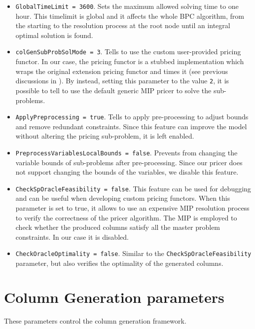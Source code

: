 \begin{itemize}
	\item \texttt{GlobalTimeLimit = 3600}.
	      Sets the maximum allowed solving time to one hour.
	      This timelimit is global and it affects the whole BPC algorithm, from the starting
	      to the resolution process at the root node until an integral optimal solution is found.
	\item \texttt{colGenSubProbSolMode = 3}.
	      Tells \bapcod{} to use the custom user-provided pricing functor.
	      In our case, the pricing functor is a stubbed implementation which wraps the original \vrpsolver{} extension pricing functor
	      and times it (see previous discussions in ).
	      By instead, setting this parameter to the value \texttt{2},
	      it is possible to tell \bapcod{} to use the default generic MIP pricer to solve the sub-problems.
	\item \texttt{ApplyPreprocessing = true}.
	      Tells \bapcod{} to apply pre-processing to adjust bounds and remove redundant constraints.
	      Since this feature can improve the model without altering the pricing sub-problem,
	      it is left enabled.
	\item \texttt{PreprocessVariablesLocalBounds = false}.
	      Prevents \bapcod{} from changing the variable bounds of sub-problems after pre-processing.
	      Since our pricer does not support changing the bounds of the variables,
	      we disable this feature.
	\item \texttt{CheckSpOracleFeasibility = false}.
	      This feature can be used for debugging and can be useful when developing custom pricing functors.
	      When this parameter is set to true, it allows to use an expensive MIP resolution process
	      to verify the correctness of the pricer algorithm.
	      The MIP is employed to check whether the produced columns satisfy all the master problem constraints.
	      In our case it is disabled.
	\item \texttt{CheckOracleOptimality = false}.
	      Similar to the \texttt{CheckSpOracleFeasibility} parameter, but also verifies the optimality of the generated columns.
\end{itemize}

\section{Column Generation parameters}

These parameters control the column generation framework.

